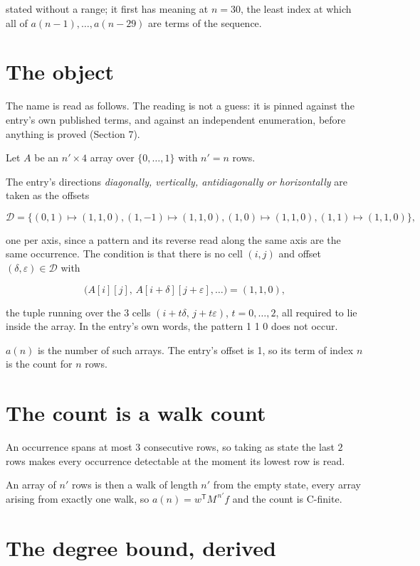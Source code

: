 \documentclass[11pt]{article}
\theoremstyle{definition}
\begin{document}
stated without a range; it first has meaning at $n = 30$, the least index at which all of $a(n-1),\dots,a(n-29)$ are terms of the sequence.

\section{The object}

The name is read as follows. The reading is not a guess: it is pinned against the entry's own published terms, and against an independent enumeration, before anything is proved (Section 7).

Let $A$ be an $n' \times 4$ array over $\{0,\dots,1\}$ with $n' = n$ rows.

The entry's directions {\itshape diagonally, vertically, antidiagonally or horizontally} are taken as the offsets

\[\mathcal{D} = \{(0,1)\mapsto(1,1,0), (1,-1)\mapsto(1,1,0), (1,0)\mapsto(1,1,0), (1,1)\mapsto(1,1,0)\},\]

one per axis, since a pattern and its reverse read along the same axis are the same occurrence. The condition is that there is no cell $(i,j)$ and offset $(\delta,\varepsilon)\in\mathcal{D}$ with

\[\bigl(A[i][j],\,A[i{+}\delta][j{+}\varepsilon],\dots\bigr) = (1, 1, 0),\]

the tuple running over the $3$ cells $(i+t\delta,\,j+t\varepsilon)$, $t = 0,\dots,2$, all required to lie inside the array. In the entry's own words, the pattern 1 1 0 does not occur.

$a(n)$ is the number of such arrays. The entry's offset is 1, so its term of index $n$ is the count for $n$ rows.

\section{The count is a walk count}

An occurrence spans at most $3$ consecutive rows, so taking as state the last $2$ rows makes every occurrence detectable at the moment its lowest row is read.

An array of $n'$ rows is then a walk of length $n'$ from the empty state, every array arising from exactly one walk, so $a(n) = w^{\mathsf T}M^{\,n'}f$ and the count is C-finite.

\section{The degree bound, derived}
\end{document}
